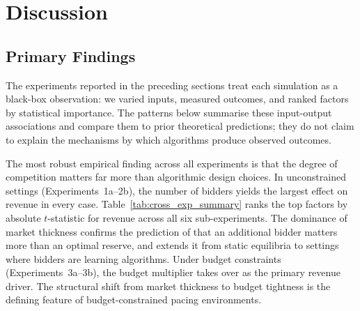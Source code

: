\section{Discussion}
\label{sec:discussion}

\subsection{Primary Findings}

The experiments reported in the preceding sections treat each simulation as a black-box observation: we varied inputs, measured outcomes, and ranked factors by statistical importance. The patterns below summarise these input-output associations and compare them to prior theoretical predictions; they do not claim to explain the mechanisms by which algorithms produce observed outcomes.

The most robust empirical finding across all experiments is that the degree of competition matters far more than algorithmic design choices. In unconstrained settings (Experiments~1a--2b), the number of bidders yields the largest effect on revenue in every case. Table~\ref{tab:cross_exp_summary} ranks the top factors by absolute $t$-statistic for revenue across all six sub-experiments. The dominance of market thickness confirms the prediction of \citet{BulowKlemperer1996} that an additional bidder matters more than an optimal reserve, and extends it from static equilibria to settings where bidders are learning algorithms. Under budget constraints (Experiments~3a--3b), the budget multiplier takes over as the primary revenue driver. The structural shift from market thickness to budget tightness is the defining feature of budget-constrained pacing environments.

